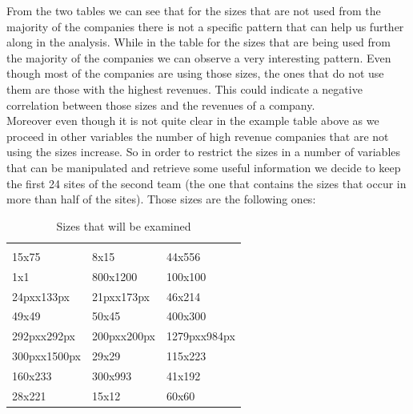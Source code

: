 \documentclass{book}
\begin{document}
From the two tables we can see that for the sizes that are not used from the majority of the companies there is not a specific pattern that can help us further along in the analysis. While in the table for the sizes that are being used from the majority of the companies we can observe a very interesting pattern. Even though most of the companies are using those sizes, the ones that do not use them are those with the highest revenues. This could indicate a negative correlation between those sizes and the revenues of a company.\\
Moreover even though it is not quite clear in the example table above as we proceed in other variables the number of high revenue companies that are not using the sizes increase. So in order to restrict the sizes in a number of variables that can be manipulated and retrieve some useful information we decide to keep the first 24 sites of the second team (the one that contains the sizes that occur in more than half of the sites). Those sizes are the following ones:
\begin{table}[H]
\centering
\caption{Sizes that will be examined}
\begin{tabular}{lll}
\hline
 \\
15x75 
& 8x15
& 44x556 
\\1x1
& 800x1200
& 100x100
\\24pxx133px
& 21pxx173px
& 46x214
\\49x49
& 50x45
& 400x300
\\292pxx292px
& 200pxx200px
& 1279pxx984px
\\300pxx1500px
& 29x29
& 115x223
\\160x233
& 300x993
& 41x192
\\28x221
& 15x12
& 60x60
\\ \hline
\end{tabular}
\end{table}
 
\end{document}
